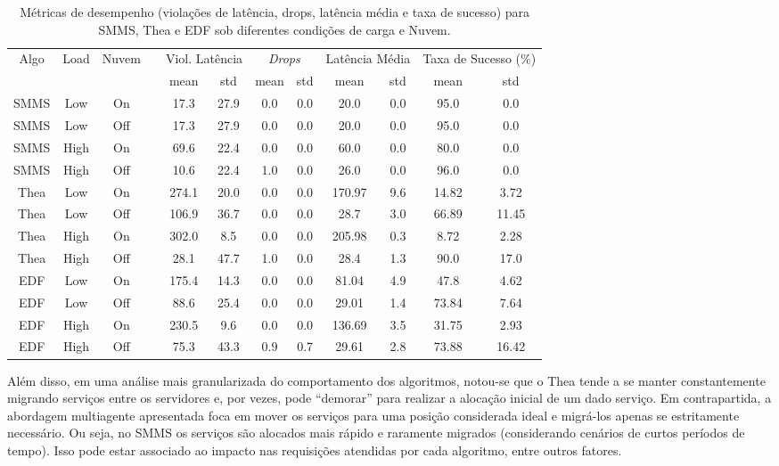 \begin{table}[ht!]
\footnotesize
\setlength{\tabcolsep}{3pt}
\renewcommand{\arraystretch}{1.15}
\caption{Métricas de desempenho (violações de latência, drops, latência média e taxa de sucesso) para SMMS, Thea e EDF sob diferentes condições de carga e Nuvem.}
\label{tab:final_results_comparison}
\begin{center}
\begin{tabular}{cccc|cc|cc|cc|cc}
\hline
Algo & Load & Nuvem & & \multicolumn{2}{c|}{Viol. Latência} & \multicolumn{2}{c|}{\textit{Drops}} & \multicolumn{2}{c|}{Latência Média} & \multicolumn{2}{c}{Taxa de Sucesso (\%)} \\\cline{5-12}
     &      &       & & mean & std & mean & std & mean & std & mean & std \\ \hline
SMMS & Low  & On    & & 17.3 & 27.9 & 0.0 & 0.0 & 20.0 & 0.0 & 95.0 & 0.0 \\
SMMS & Low  & Off   & & 17.3 & 27.9 & 0.0 & 0.0 & 20.0 & 0.0 & 95.0 & 0.0 \\
SMMS & High & On    & & 69.6 & 22.4 & 0.0 & 0.0 & 60.0 & 0.0 & 80.0 & 0.0 \\
SMMS & High & Off   & & 10.6 & 22.4 & 1.0 & 0.0 & 26.0 & 0.0 & 96.0 & 0.0 \\ \hline
Thea & Low  & On    & & 274.1 & 20.0 & 0.0 & 0.0 & 170.97 & 9.6 & 14.82 & 3.72 \\
Thea & Low  & Off   & & 106.9 & 36.7 & 0.0 & 0.0 & 28.7 & 3.0 & 66.89 & 11.45 \\
Thea & High & On    & & 302.0 & 8.5 & 0.0 & 0.0 & 205.98 & 0.3 & 8.72 & 2.28 \\
Thea & High & Off   & & 28.1 & 47.7 & 1.0 & 0.0 & 28.4 & 1.3 & 90.0 & 17.0 \\ \hline
EDF  & Low  & On    & & 175.4 & 14.3 & 0.0 & 0.0 & 81.04 & 4.9 & 47.8 & 4.62 \\
EDF  & Low  & Off   & & 88.6 & 25.4 & 0.0 & 0.0 & 29.01 & 1.4 & 73.84 & 7.64 \\
EDF  & High & On    & & 230.5 & 9.6 & 0.0 & 0.0 & 136.69 & 3.5 & 31.75 & 2.93 \\
EDF  & High & Off   & & 75.3 & 43.3 & 0.9 & 0.7 & 29.61 & 2.8 & 73.88 & 16.42 \\ \hline
\end{tabular}
\end{center}
\end{table}

Além disso, em uma análise mais granularizada do comportamento dos algoritmos, notou-se que o Thea tende a se manter constantemente migrando serviços entre os servidores e, por vezes, pode ``demorar'' para realizar a alocação inicial de um dado serviço. Em contrapartida, a abordagem multiagente apresentada foca em mover os serviços para uma posição considerada ideal e migrá-los apenas se estritamente necessário. Ou seja, no SMMS os serviços são alocados mais rápido e raramente migrados (considerando cenários de curtos períodos de tempo). Isso pode estar associado ao impacto nas requisições atendidas por cada algoritmo, entre outros fatores.